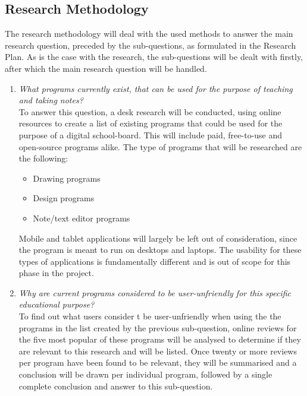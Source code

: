 \documentclass[a4paper,12pt]{article}
\begin{document}
\subsection{Research Methodology}

The research methodology will deal with the used methods to answer the main research question, preceded by the sub-questions, as formulated in the Research Plan. As is the case with the research, the sub-questions will be dealt with firstly, after which the main research question will be handled.

\begin{enumerate}
  
\item \textit{What programs currently exist, that can be used for the purpose of teaching and taking notes?}\\
  To answer this question, a desk research will be conducted, using online resources to create a list of existing programs that could be used for the purpose of a digital school-board. This will include paid, free-to-use and open-source programs alike. The type of programs that will be researched are the following:
  \begin{itemize}
  \item Drawing programs
  \item Design programs
  \item Note/text editor programs
  \end{itemize}

  Mobile and tablet applications will largely be left out of consideration, since the program is meant to run on desktops and laptops. The usability for these types of applications is fundamentally different and is out of scope for this phase in the project.
  
\item \textit{Why are current programs considered to be user-unfriendly for this specific educational purpose?}\\
  To find out what users consider t be user-unfriendly when using the the programs in the list created by the previous sub-question, online reviews for the five most popular of these programs will be analysed to determine if they are relevant to this research and will be listed. Once twenty or more reviews per program have been found to be relevant, they will be summarised and a conclusion will be drawn per individual program, followed by a single complete conclusion and answer to this sub-question.
  

\end{enumerate}
\end{document}
